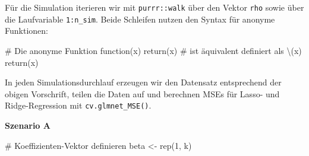 \documentclass[
  a4paper,
  DIV=11,
  oneside]{scrreprt}
\newenvironment{Shaded}{\begin{snugshade}}{\end{snugshade}}
\newcommand{\CommentTok}[1]{\textcolor[rgb]{0.37,0.37,0.37}{#1}}
\newcommand{\ControlFlowTok}[1]{\textcolor[rgb]{0.00,0.23,0.31}{#1}}
\newcommand{\DecValTok}[1]{\textcolor[rgb]{0.68,0.00,0.00}{#1}}
\newcommand{\FunctionTok}[1]{\textcolor[rgb]{0.28,0.35,0.67}{#1}}
\newcommand{\NormalTok}[1]{\textcolor[rgb]{0.00,0.23,0.31}{#1}}
\newcommand{\OtherTok}[1]{\textcolor[rgb]{0.00,0.23,0.31}{#1}}
\begin{document}
Für die Simulation iterieren wir mit \texttt{purrr::walk} über den
Vektor \texttt{rho} sowie über die Laufvariable \texttt{1:n\_sim}. Beide
Schleifen nutzen den Syntax für anonyme Funktionen:

\begin{Shaded}
\begin{Highlighting}[]
\CommentTok{\# Die anonyme Funktion}
\ControlFlowTok{function}\NormalTok{(x) }\FunctionTok{return}\NormalTok{(x)}
\CommentTok{\# ist äquivalent definiert als}
\NormalTok{\textbackslash{}(x) }\FunctionTok{return}\NormalTok{(x)}
\end{Highlighting}
\end{Shaded}

In jeden Simulationsdurchlauf erzeugen wir den Datensatz entsprechend
der obigen Vorschrift, teilen die Daten auf und berechnen MSEs für
Lasso- und Ridge-Regression mit \texttt{cv.glmnet\_MSE()}.

\textbf{Szenario A}

\begin{Shaded}
\begin{Highlighting}[]
\CommentTok{\# Koeffizienten{-}Vektor definieren}
\NormalTok{beta }\OtherTok{\textless{}{-}} \FunctionTok{rep}\NormalTok{(}\DecValTok{1}\NormalTok{, k) }
\end{Highlighting}
\end{Shaded}
\end{document}
